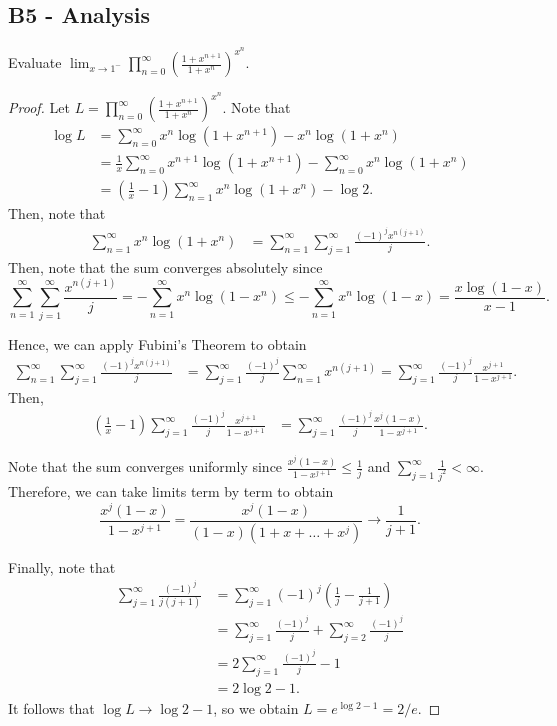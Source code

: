 \documentclass[11pt]{scrartcl}
\newcommand{\<}{\langle}
\renewcommand{\>}{\rangle}
\begin{document}
\subsection{B5 - Analysis}
Evaluate $\lim_{x\to 1^-}\prod_{n=0}^{\infty}\left(\frac{1+x^{n+1}}{1+x^n}\right)^{x^n}$.
\begin{proof}
Let $L = \prod_{n=0}^{\infty}\left(\frac{1+x^{n+1}}{1+x^n}\right)^{x^n}$.  Note that 
\begin{align*}
\log L &= \sum_{n=0}^{\infty} x^n \log (1 + x^{n + 1}) - x^n \log (1 + x^n) \\
&= \frac{1}{x}\sum_{n=0}^{\infty} x^{n+1} \log (1 + x^{n+1})  - \sum_{n=0}^{\infty} x^n \log(1 + x^n) \\
&=\left (\frac{1}{x} - 1 \right) \sum_{n=1}^\infty x^n \log(1 + x^n) - \log 2.
\end{align*}
Then, note that 
\begin{align*}
\sum_{n=1}^\infty x^n \log (1 + x^n) &= \sum_{n=1}^\infty \sum_{j=1}^\infty \frac{(-1)^j x^{n(j + 1)}}{j}.
\end{align*}
Then, note that the sum converges absolutely since 
$$\sum_{n=1}^\infty \sum_{j=1}^\infty \frac{x^{n(j + 1)}}{j} = -\sum_{n=1}^\infty x^n \log(1 - x^n) \le -\sum_{n=1}^\infty x^n \log (1 - x) = \frac{x\log(1 - x)}{x - 1}.$$

Hence, we can apply Fubini's Theorem to obtain
\begin{align*}
\sum_{n=1}^\infty \sum_{j=1}^\infty \frac{(-1)^j x^{n(j + 1)}}{j} &= \sum_{j=1}^\infty \frac{(-1)^j}{j}\sum_{n=1}^\infty x^{n(j + 1)} = \sum_{j=1}^\infty \frac{(-1)^j}{j} \frac{x^{j + 1}}{1 - x^{j + 1}}.
\end{align*}
Then,
\begin{align*}
\left (\frac{1}{x} - 1 \right) \sum_{j=1}^\infty \frac{(-1)^j}{j} \frac{x^{j + 1}}{1 - x^{j + 1}} &= \sum_{j=1}^\infty \frac{(-1)^j}{j} \frac{x^{j} (1 - x)}{1 - x^{j + 1}}.
\end{align*}

Note that the sum converges uniformly since $ \frac{x^{j} (1 - x)}{1 - x^{j + 1}} \le \frac{1}{j}$ and $\sum_{j=1}^\infty \frac{1}{j^2} < \infty$.  Therefore, we can take limits term by term to obtain
$$ \frac{x^{j} (1 - x)}{1 - x^{j + 1}} = \frac{x^j(1 - x)}{(1 - x)(1 + x + \dots + x^{j})}\to \frac{1}{j + 1}.$$

Finally, note that 
\begin{align*}
\sum_{j=1}^\infty \frac{(-1)^j}{j(j + 1)} &= \sum_{j=1}^\infty (-1)^j\left (\frac{1}{j} - \frac{1}{j + 1} \right) \\
&= \sum_{j=1}^\infty \frac{(-1)^j}{j} + \sum_{j=2}^\infty \frac{(-1)^j}{j} \\
&= 2\sum_{j=1}^\infty \frac{(-1)^j}{j} - 1 \\
&= 2 \log 2 - 1.
\end{align*}
It follows that $\log L \to \log 2 - 1$, so we obtain $L = e^{\log 2 - 1} = 2/e$.
\end{proof}
\pagebreak
\end{document}
